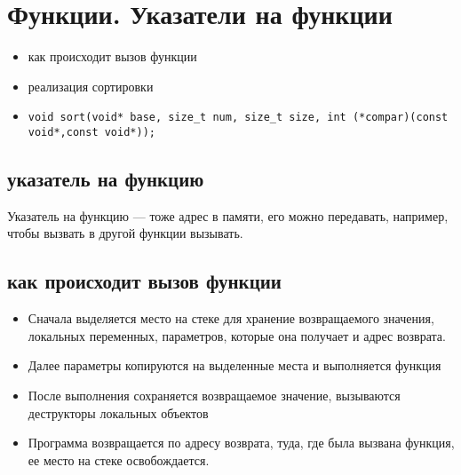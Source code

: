 % 
% 
\section{Функции. Указатели на функции}
\begin{itemize}[noitemsep]
    \item как происходит вызов функции
    \item реализация сортировки
    \item \begin{verbatim}void sort(void* base, size_t num, size_t size, int (*compar)(const void*,const void*));\end{verbatim}
\end{itemize}
\subsection{указатель на функцию}
Указатель на  функцию --- тоже адрес в памяти, его можно передавать, например, чтобы вызвать в другой функции вызывать.
\subsection{как происходит вызов функции}
\begin{itemize}[noitemsep]
    \item 
Сначала выделяется место на стеке для хранение возвращаемого значения, локальных переменных, параметров, которые она получает и адрес возврата.
\item 
    Далее параметры копируются на выделенные места и выполняется функция
    \item 
	После выполнения сохраняется возвращаемое значение, вызываются деструкторы локальных объектов
	\item 
	    Программа возвращается по адресу возврата, туда, где была вызвана функция, ее место на стеке освобождается.
\end{itemize}
